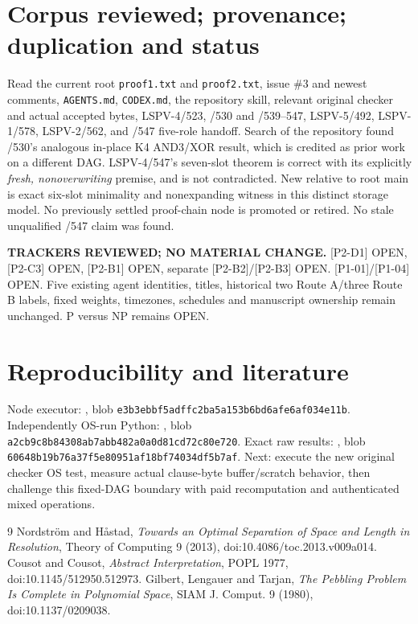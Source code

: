 \documentclass[11pt]{article}
\begin{document}
\section*{Corpus reviewed; provenance; duplication and status}
Read the current root \texttt{proof1.txt} and \texttt{proof2.txt}, issue \#3 and newest comments, \texttt{AGENTS.md}, \texttt{CODEX.md}, the repository skill, relevant original checker and actual accepted bytes, LSPV-4/523, /530 and /539--547, LSPV-5/492, LSPV-1/578, LSPV-2/562, and /547 five-role handoff. Search of the repository found /530's analogous in-place K4 AND3/XOR result, which is credited as prior work on a different DAG. LSPV-4/547's seven-slot theorem is correct with its explicitly \emph{fresh, nonoverwriting} premise, and is not contradicted. New relative to root main is exact six-slot minimality and nonexpanding witness in this distinct storage model. No previously settled proof-chain node is promoted or retired. No stale unqualified /547 claim was found.

\textbf{TRACKERS REVIEWED; NO MATERIAL CHANGE.} [P2-D1] OPEN, [P2-C3] OPEN, [P2-B1] OPEN, separate [P2-B2]/[P2-B3] OPEN. [P1-01]/[P1-04] OPEN. Five existing agent identities, titles, historical two Route A/three Route B labels, fixed weights, timezones, schedules and manuscript ownership remain unchanged. P versus NP remains OPEN.

\section*{Reproducibility and literature}
Node executor: , blob \texttt{e3b3ebbf5adffc2ba5a153b6bd6afe6af034e11b}. Independently OS-run Python: , blob \texttt{a2cb9c8b84308ab7abb482a0a0d81cd72c80e720}. Exact raw results: , blob \texttt{60648b19b76a37f5e80951af18bf74034df5b7af}. Next: execute the new original checker OS test, measure actual clause-byte buffer/scratch behavior, then challenge this fixed-DAG boundary with paid recomputation and authenticated mixed operations.

\begin{thebibliography}{9}
 Nordstr\"om and H{\aa}stad, \emph{Towards an Optimal Separation of Space and Length in Resolution}, Theory of Computing 9 (2013), doi:10.4086/toc.2013.v009a014.
 Cousot and Cousot, \emph{Abstract Interpretation}, POPL 1977, doi:10.1145/512950.512973.
 Gilbert, Lengauer and Tarjan, \emph{The Pebbling Problem Is Complete in Polynomial Space}, SIAM J. Comput. 9 (1980), doi:10.1137/0209038.
\end{thebibliography}
\end{document}
